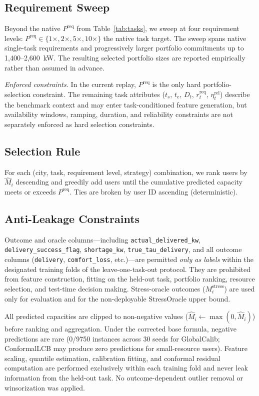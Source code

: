 \documentclass[utf8]{FrontiersinHarvard}
\newcommand{\Mhat}{\widehat{M}}
\newcommand{\Preq}{P^{\mathrm{req}}}
\begin{document}
\subsection{Requirement Sweep}

Beyond the native $\Preq$ from Table~\ref{tab:tasks}, we sweep
at four requirement levels: $\Preq \in \{1\times, 2\times,
5\times, 10\times\}$ the native task target. The sweep spans
native single-task requirements and progressively larger
portfolio commitments up to 1{,}400--2{,}600~kW. The
resulting selected portfolio sizes are reported empirically
rather than assumed in advance.

\textit{Enforced constraints.} In the current replay, $\Preq$
is the only hard portfolio-selection constraint. The remaining
task attributes ($t_s$, $t_e$, $D_t$, $r_t^{\mathrm{req}}$,
$\eta_t^{\mathrm{rel}}$) describe the benchmark context and
may enter task-conditioned feature generation, but
availability windows, ramping, duration, and reliability
constraints are not separately enforced as hard selection
constraints.


\subsection{Selection Rule}

For each (city, task, requirement level, strategy) combination,
we rank users by $\Mhat_i$ descending and greedily add users
until the cumulative predicted capacity meets or exceeds $\Preq$.
Ties are broken by user ID ascending (deterministic).

\subsection{Anti-Leakage Constraints}

Outcome and oracle columns---including
\texttt{actual\_delivered\_kw}, \texttt{delivery\_success\_flag},
\texttt{shortage\_kw}, \texttt{true\_tau\_delivery}, and all
outcome columns (\texttt{delivery}, \texttt{comfort\_loss},
etc.)---are permitted \emph{only as labels} within the
designated training folds of the leave-one-task-out protocol.
They are prohibited from feature construction, fitting on the
held-out task, portfolio ranking, resource selection, and
test-time decision making. Stress-oracle outcomes
($M_i^{\mathrm{stress}}$) are used only for evaluation and for
the non-deployable StressOracle upper bound.

All predicted capacities are clipped to non-negative values
($\Mhat_i \leftarrow \max(0, \Mhat_i)$) before ranking and
aggregation. Under the corrected base formula, negative
predictions are rare (0/9750 instances across 30 seeds for
GlobalCalib; ConformalLCB may produce zero predictions for
small-resource users). Feature scaling, quantile estimation,
calibration fitting, and conformal residual computation are
performed exclusively within each training fold and never
leak information from the held-out task. No outcome-dependent
outlier removal or winsorization was applied.
\end{document}
